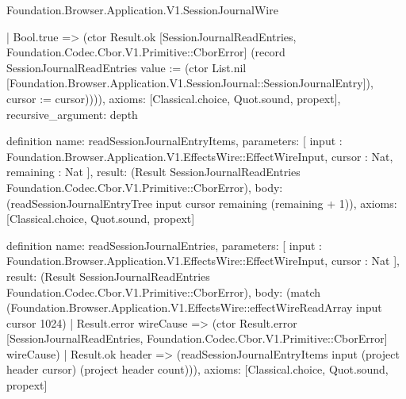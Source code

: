 \begin{lexlean}{Foundation.Browser.Application.V1.SessionJournalWire}
\begin{semanticmodule}
{      | Bool.true => (ctor Result.ok [SessionJournalReadEntries, Foundation.Codec.Cbor.V1.Primitive::CborError] (record SessionJournalReadEntries {value := (ctor List.nil [Foundation.Browser.Application.V1.SessionJournal::SessionJournalEntry]), cursor := cursor})))),
  axioms: [Classical.choice, Quot.sound, propext],
  recursive_argument: depth
}

definition{
  name: readSessionJournalEntryItems,
  parameters: [
    input : Foundation.Browser.Application.V1.EffectsWire::EffectWireInput,
    cursor : Nat,
    remaining : Nat
  ],
  result: (Result SessionJournalReadEntries Foundation.Codec.Cbor.V1.Primitive::CborError),
  body: (readSessionJournalEntryTree input cursor remaining (remaining + 1)),
  axioms: [Classical.choice, Quot.sound, propext]
}

definition{
  name: readSessionJournalEntries,
  parameters: [
    input : Foundation.Browser.Application.V1.EffectsWire::EffectWireInput,
    cursor : Nat
  ],
  result: (Result SessionJournalReadEntries Foundation.Codec.Cbor.V1.Primitive::CborError),
  body: (match (Foundation.Browser.Application.V1.EffectsWire::effectWireReadArray input cursor 1024)
    | Result.error wireCause => (ctor Result.error [SessionJournalReadEntries, Foundation.Codec.Cbor.V1.Primitive::CborError] wireCause)
    | Result.ok header => (readSessionJournalEntryItems input (project header cursor) (project header count))),
  axioms: [Classical.choice, Quot.sound, propext]
}


\end{semanticmodule}
\end{lexlean}
